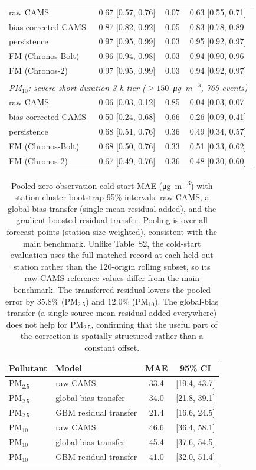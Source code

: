 \documentclass[11pt]{article}
\begin{document}
\begin{table}[htbp]
\begin{tabular}{lccc}
\quad raw CAMS & 0.67 [0.57, 0.76] & 0.07 & 0.63 [0.55, 0.71] \\
\quad bias-corrected CAMS & 0.87 [0.82, 0.92] & 0.05 & 0.83 [0.78, 0.89] \\
\quad persistence & 0.97 [0.95, 0.99] & 0.03 & 0.95 [0.92, 0.97] \\
\quad FM (Chronos-Bolt) & 0.96 [0.94, 0.98] & 0.03 & 0.94 [0.90, 0.96] \\
\quad FM (Chronos-2) & 0.97 [0.95, 0.99] & 0.03 & 0.94 [0.92, 0.97] \\
\multicolumn{4}{l}{\textit{PM$_{10}$: severe short-duration 3-h tier ($\geq150$~\si{\micro\gram\per\cubic\metre}, 765 events)}} \\
\quad raw CAMS & 0.06 [0.03, 0.12] & 0.85 & 0.04 [0.03, 0.07] \\
\quad bias-corrected CAMS & 0.50 [0.24, 0.68] & 0.66 & 0.26 [0.09, 0.41] \\
\quad persistence & 0.68 [0.51, 0.76] & 0.36 & 0.49 [0.34, 0.57] \\
\quad FM (Chronos-Bolt) & 0.68 [0.50, 0.76] & 0.33 & 0.51 [0.33, 0.62] \\
\quad FM (Chronos-2) & 0.67 [0.49, 0.76] & 0.36 & 0.48 [0.30, 0.60] \\
\bottomrule\end{tabular}\end{table}

\begin{table}[htbp]\centering\footnotesize
\caption{Pooled zero-observation cold-start MAE (\si{\micro\gram\per\cubic\metre}) with station cluster-bootstrap 95\% intervals: raw CAMS, a global-bias transfer (single mean residual added), and the gradient-boosted residual transfer. Pooling is over all forecast points (station-size weighted), consistent with the main benchmark. Unlike Table~S2, the cold-start evaluation uses the full matched record at each held-out station rather than the 120-origin rolling subset, so its raw-CAMS reference values differ from the main benchmark. The transferred residual lowers the pooled error by $35.8\%$ (PM$_{2.5}$) and $12.0\%$ (PM$_{10}$). The global-bias transfer (a single source-mean residual added everywhere) does not help for PM$_{2.5}$, confirming that the useful part of the correction is spatially structured rather than a constant offset.}
\begin{tabular}{llcc}\toprule
Pollutant & Model & MAE & 95\% CI \\ \midrule
PM$_{2.5}$ & raw CAMS & 33.4 & [19.4, 43.7] \\
PM$_{2.5}$ & global-bias transfer & 34.0 & [21.8, 39.1] \\
PM$_{2.5}$ & GBM residual transfer & 21.4 & [16.6, 24.5] \\
PM$_{10}$ & raw CAMS & 46.6 & [36.4, 58.1] \\
PM$_{10}$ & global-bias transfer & 45.4 & [37.6, 54.5] \\
PM$_{10}$ & GBM residual transfer & 41.0 & [32.0, 51.4] \\
\bottomrule\end{tabular}\end{table}
\end{document}
